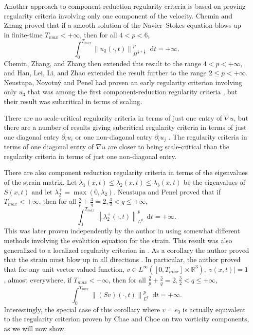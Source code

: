 \documentclass[11pt]{article}
\theoremstyle{plain}
\theoremstyle{remark}
\numberwithin{equation}{section}
\newcommand{\diff}{\mathop{}\!\mathrm{d}}
\begin{document}
Another approach to component reduction regularity criteria is based on proving regularity criteria involving only one component of the velocity.
Chemin and Zhang proved \cite{CheminZhang} that if a smooth solution of the Navier--Stokes equation blows up in finite-time $T_{max}<+\infty$, then for all $4<p<6$,
\begin{equation}
    \int_0^{T_{max}}\left\|u_3(\cdot,t)
    \right\|_{\dot{H}^{\frac{1}{2}+\frac{2}{p}}}^p
    \diff t=+\infty.
\end{equation}
Chemin, Zhang, and Zhang then extended \cite{CheminZhangZhang} this result to the range $4<p<+\infty$,
and Han, Lei, Li, and Zhao extended \cite{HanLeiLiZhao} the result further to the range $2\leq p<+\infty$.
Neustupa, Novotn\'y and Penel had proven an early regularity criterion involving only $u_3$ that was among the first component-reduction regularity criteria \cite{NeustupaOneComp}, but their result was subcritical in terms of scaling.

There are no scale-critical regularity criteria in terms of just one entry of $\nabla u$, but there are a number of results giving subcritical regularity criteria in terms of just one diagonal entry $\partial_i u_i$  or one non-diagonal entry $\partial_i u_j$
\cites{A,B,C,D,E,F,I,J,K,HanLeiLiZhao,SkalakRecent}.
The regularity criteria in terms of one diagonal entry of $\nabla u$ are closer to being scale-critical than the regularity criteria in terms of just one non-diagonal entry.

There are also component reduction regularity criteria in terms of the eigenvalues of the strain matrix. Let $\lambda_1(x,t)\leq \lambda_2(x,t) \leq \lambda_3(x,t)$ be the eigenvalues of $S(x,t)$
and let $\lambda_2^+=\max\left(0,\lambda_2\right)$.
Neustupa and Penel proved \cites{NeuPen1,NeuPen2} that if $T_{max}<+\infty$, then for all $\frac{2}{p}+\frac{3}{q}=2, 
\frac{3}{2}<q\leq +\infty$,
\begin{equation}
    \int_0^{T_{max}}
    \left\|\lambda_2^+(\cdot,t)\right\|_{L^q}^p
    \diff t=+\infty.
\end{equation}
This was later proven independently by the author in \cite{MillerStrain} using somewhat different methods involving the evolution equation for the strain.
This result was also generalized to a localized regularity criterion in \cites{NeuPen3}.
As a corollary the author proved that the strain must blow up in all directions \cite{MillerStrain}. In particular, the author proved that for any unit vector valued function, 
$v\in L^\infty\left(
[0,T_{max}]\times\mathbb{R}^3\right), |v(x,t)|=1$, almost everywhere,
if $T_{max}<+\infty$, then for all 
$\frac{2}{p}+\frac{3}{q}=2, 
\frac{3}{2}<q\leq +\infty$,
\begin{equation}
    \int_0^{T_{max}}
    \left\|(Sv)(\cdot,t)\right\|_{L^q}^p
    \diff t=+\infty.
\end{equation}
Interestingly, the special case of this corollary where $v=e_3$ is actually equivalent to the regularity criterion proven by Chae and Choe on two vorticity components, as we will now show.
\end{document}
